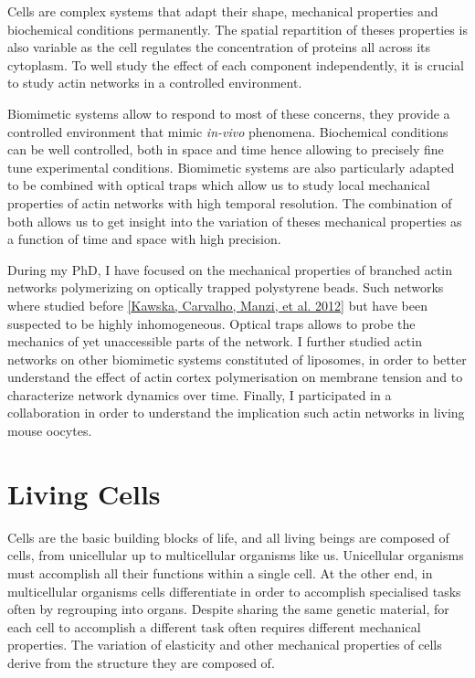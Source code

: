 \documentclass[A4paperpaper,11pt,english]{sphinxmanual}
\begin{document}
Cells are complex systems that adapt their shape, mechanical properties and
biochemical conditions permanently. The spatial repartition of theses
properties is also variable as the cell regulates the concentration of proteins
all across its cytoplasm. To well study the effect of each component independently,
it is crucial to study actin networks in a controlled environment.

Biomimetic systems allow to respond to most of these concerns, they provide a
controlled environment that mimic \emph{in-vivo} phenomena. Biochemical conditions
can be well controlled, both in space and time hence allowing to precisely fine tune
experimental conditions. Biomimetic systems are also particularly adapted to be combined with
optical traps which allow us to study local mechanical properties of actin
networks with high temporal resolution. The combination of both allows us to get
insight into the variation of theses mechanical properties as a function of
time and space with high precision.

During my PhD, I have focused on the mechanical properties of branched actin
networks polymerizing on optically trapped polystyrene beads. Such networks where
studied before {\hyperref[index-latex:kawska2012]{{[}Kawska, Carvalho, Manzi,  et al.  2012{]}}} but have been suspected to be highly
inhomogeneous. Optical traps allows to probe the mechanics of yet unaccessible parts of
the network.
I further studied actin
networks on other biomimetic systems constituted of liposomes, in order to better
understand the effect of actin cortex polymerisation on membrane tension and to
characterize network dynamics over time. Finally,  I participated in a
collaboration in order to understand the implication such actin networks in
living mouse oocytes.


\section{Living Cells}
\label{index-latex:living-cells}
Cells are the basic building blocks of life, and all living beings are composed of
cells, from unicellular up to multicellular organisms like us. Unicellular
organisms must accomplish all their functions within a single cell. At the other end,
in multicellular organisms cells differentiate in order to accomplish specialised
tasks often by regrouping into organs. Despite sharing the same genetic
material, for each cell to accomplish a different task often requires different
mechanical properties. The variation of elasticity and other
mechanical properties of cells derive from the structure they are composed of.
\end{document}

